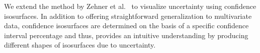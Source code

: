 %
%
We extend the method by Zehner et al.~\cite{zehner2010visualization} to visualize uncertainty using confidence isosurfaces.
%
In addition to offering straightforward generalization to multivariate data, confidence isosurfaces are determined on the basis of a specific confidence interval percentage and thus, provides an intuitive understanding by producing different shapes of isosurfaces due to uncertainty. 
%
%
